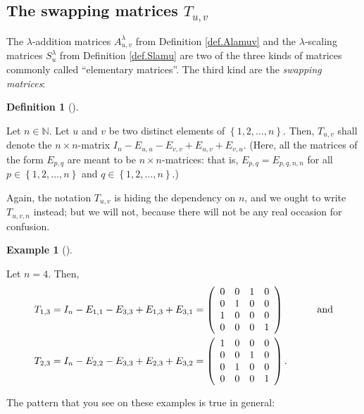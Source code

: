 \documentclass[numbers=enddot,12pt,final,onecolumn,notitlepage]{scrartcl}%
\theoremstyle{definition}
\newtheorem{defi}[theo]{Definition}
\newenvironment{definition}[1][]
{\begin{defi}[#1]\begin{leftbar}}
{\end{leftbar}\end{defi}}
\newtheorem{exam}[theo]{Example}
\newenvironment{example}[1][]
{\begin{exam}[#1]\begin{leftbar}}
{\end{leftbar}\end{exam}}
\begin{document}
\subsection{The swapping matrices $T_{u,v}$}

The $\lambda$-addition matrices $A_{u,v}^{\lambda}$ from Definition
\ref{def.Alamuv} and the $\lambda$-scaling matrices $S_{u}^{\lambda}$ from
Definition \ref{def.Slamu} are two of the three kinds of matrices commonly
called \textquotedblleft elementary matrices\textquotedblright. The third kind
are the \textit{swapping matrices}:

\begin{definition}
\label{def.Tuv}Let $n\in\mathbb{N}$. Let $u$ and $v$ be two distinct elements
of $\left\{  1,2,\ldots,n\right\}  $. Then, $T_{u,v}$ shall denote the
$n\times n$-matrix $I_{n}-E_{u,u}-E_{v,v}+E_{u,v}+E_{v,u}$. (Here, all the
matrices of the form $E_{p,q}$ are meant to be $n\times n$-matrices: that is,
$E_{p,q}=E_{p,q,n,n}$ for all $p\in\left\{  1,2,\ldots,n\right\}  $ and
$q\in\left\{  1,2,\ldots,n\right\}  $.)

Again, the notation $T_{u,v}$ is hiding the dependency on $n$, and we ought to
write $T_{u,v,n}$ instead; but we will not, because there will not be any real
occasion for confusion.
\end{definition}

\begin{example}
Let $n=4$. Then,%
\begin{align*}
T_{1,3}  &  =I_{n}-E_{1,1}-E_{3,3}+E_{1,3}+E_{3,1}=\left(
\begin{array}
[c]{cccc}%
0 & 0 & 1 & 0\\
0 & 1 & 0 & 0\\
1 & 0 & 0 & 0\\
0 & 0 & 0 & 1
\end{array}
\right)  \ \ \ \ \ \ \ \ \ \ \text{and}\\
T_{2,3}  &  =I_{n}-E_{2,2}-E_{3,3}+E_{2,3}+E_{3,2}=\left(
\begin{array}
[c]{cccc}%
1 & 0 & 0 & 0\\
0 & 0 & 1 & 0\\
0 & 1 & 0 & 0\\
0 & 0 & 0 & 1
\end{array}
\right)  .
\end{align*}

\end{example}

The pattern that you see on these examples is true in general:
\end{document}
